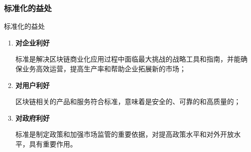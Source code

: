 \documentclass[11pt]{beamer}
\begin{document}
\subsubsection{标准化的益处}
\begin{frame}{标准化的益处}

	\begin{enumerate}
		\item \textbf{对企业利好}

		      {\scriptsize 标准是解决区块链商业化应用过程中面临最大挑战的战略工具和指南，并能确保业务高效运营，提高生产率和帮助企业拓展新的市场；}

		\item \textbf{对用户利好}

		      {\scriptsize 区块链相关的产品和服务符合标准，意味着是安全的、可靠的和高质量的；}

		\item \textbf{对政府利好}

		      {\scriptsize 标准是制定政策和加强市场监管的重要依据，对提高政策水平和对外开放水平，具有重要作用。	}
	\end{enumerate}
\end{frame}
\end{document}
